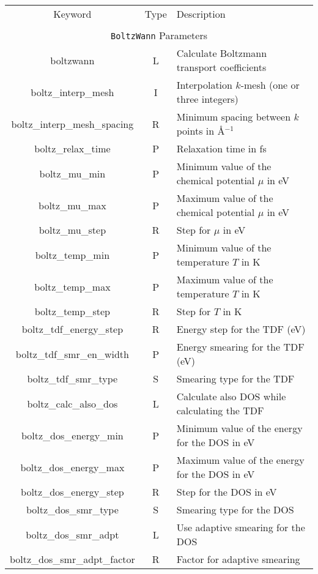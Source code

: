 \begin{table}[hH!]
\begin{center}
\begin{tabular}{|c|c|p{6cm}|}
\hline
Keyword & Type & Description \\
        &      &             \\
\hline\hline
\multicolumn{3}{|c|}{{\tt BoltzWann} Parameters} \\
\hline
{\sc boltzwann}   & L & Calculate Boltzmann transport coefficients \\
{\sc boltz\_interp\_mesh} & I & Interpolation $k$-mesh (one or three integers)\\ 
{\sc boltz\_interp\_mesh\_spacing} & R & Minimum spacing between $k$ points in \AA$^{-1}$\\
{\sc boltz\_relax\_time} & P & Relaxation time in fs\\
{\sc boltz\_mu\_min} & P & Minimum value of the chemical potential $\mu$ in eV\\
{\sc boltz\_mu\_max} & P & Maximum value of the chemical potential $\mu$ in eV\\
{\sc boltz\_mu\_step} & R & Step for $\mu$ in eV\\
{\sc boltz\_temp\_min} & P & Minimum value of the temperature $T$ in K \\
{\sc boltz\_temp\_max} & P & Maximum value of the temperature $T$ in K \\
{\sc boltz\_temp\_step} & R & Step for $T$ in K \\
{\sc boltz\_tdf\_energy\_step} & R & Energy step for the TDF (eV) \\
{\sc boltz\_tdf\_smr\_en\_width} & P & Energy smearing for the TDF (eV) \\
{\sc boltz\_tdf\_smr\_type} & S & Smearing type for the TDF \\
{\sc boltz\_calc\_also\_dos} & L & Calculate also DOS while calculating the TDF\\
{\sc boltz\_dos\_energy\_min} & P & Minimum value of the energy for the DOS in eV \\
{\sc boltz\_dos\_energy\_max} & P & Maximum value of the energy for the DOS in eV \\
{\sc boltz\_dos\_energy\_step} & R & Step for the DOS in eV\\
{\sc boltz\_dos\_smr\_type} & S & Smearing type for the DOS \\
{\sc boltz\_dos\_smr\_adpt} & L & Use adaptive smearing for the DOS \\
{\sc boltz\_dos\_smr\_adpt\_factor} & R & Factor for adaptive smearing \\

\end{tabular}
\end{center}
\end{table}
